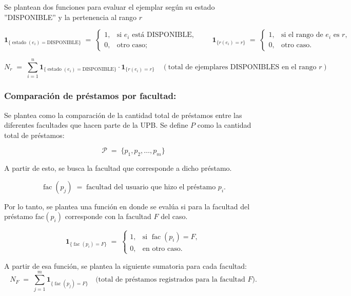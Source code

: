 \documentclass[spanish]{ieee_upb}
\begin{document}
Se plantean dos funciones para evaluar el ejemplar según su estado ''DISPONIBLE'' y la pertenencia al rango \(r\)


\[
  \mathbf 1_{\{\operatorname{estado}(e_i)=\text{DISPONIBLE}\}}
  \;=\;
  \begin{cases}
    1, & \text{si }e_i\text{ está DISPONIBLE},\\
    0, & \text{otro caso;}
  \end{cases}
\qquad
  \mathbf 1_{\{r(e_i)=r\}}
  \;=\;
  \begin{cases}
    1, & \text{si el rango de }e_i\text{ es }r,\\
    0, & \text{otro caso.}
  \end{cases}
\]

\[
  N_r
  \;=\;
  \sum_{i=1}^{n}
    \mathbf 1_{\{\operatorname{estado}(e_i)=\text{DISPONIBLE}\}}
    \cdot
    \mathbf 1_{\{r(e_i)=r\}}
  \quad
  \left(\text{total de ejemplares DISPONIBLES en el rango }r\right)
\]





\subsubsection{Comparación de préstamos por facultad:}
Se plantea como la comparación de la cantidad total de préstamos entre las diferentes facultades que hacen parte de la UPB. Se define \(P\) como la cantidad total de préstamos:

\[
  \mathcal{P}\;=\;\{
      p_1,p_2,\dots,p_m
  \}
\]

A partir de esto, se busca la facultad que corresponde a dicho préstamo. 

\[
  \operatorname{fac}(p_j)\;=\;\text{facultad del usuario que hizo el préstamo }p_i.
\]

Por lo tanto, se plantea una función en donde se evalúa si para la facultad del préstamo fac\((p_i)\) corresponde con la facultad \(F\) del caso. 

\[
  \mathbf 1_{\{\operatorname{fac}(p_i)=F\}}
  \;=\;
  \begin{cases}
    1, & \text{si } \operatorname{fac}(p_i)=F,\\[4pt]
    0, & \text{en otro caso.}
  \end{cases}
\]

A partir de esa función, se plantea la siguiente sumatoria para cada facultad:
\[
  N_F
  \;=\;
  \sum_{j=1}^{m}
    \mathbf 1_{\{\operatorname{fac}(p_j)=F\}}
  \quad
  \bigl(\text{total de préstamos registrados para la facultad }F\bigr).
\]
\end{document}
